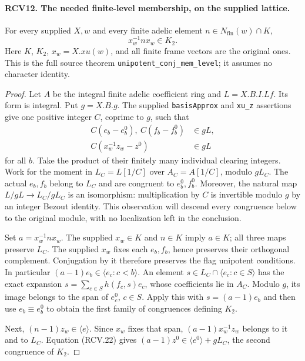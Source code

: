 
\paragraph{RCV12. The needed finite-level membership, on the supplied lattice.}
\label{claim:RCV12}
For every supplied \(X,w\) and every finite adelic element
\(n\in N_{\mathrm{fin}}(w)\cap K\),
\[
                         x_w^{-1}nx_w\in K_2.
\tag{RCV.21}
\]
Here \(K\), \(K_2\), \(x_w=X.xu(w)\), and all finite frame
vectors are the original ones.  This is the full source theorem
\texttt{unipotent\_conj\_mem\_level}; it assumes no character
identity.
\begin{proof}
Let \(A\) be the integral finite adelic coefficient ring and
\(L=X.B.I.Lf\).  Its form is integral.  Put \(g=X.B.g\).
The supplied \texttt{basisApprox} and \texttt{xu\_z} assertions
give one positive integer \(C\), coprime to \(g\), such that
\[
 \begin{split}
 C(e_b-e_b^0),\ C(f_b-f_b^0)&\in gL,\\
 C(x_w^{-1}z_w-z^0)&\in gL
 \end{split}
\tag{RCV.22}
\]
for all \(b\).  Take the product of their finitely many individual
clearing integers.  Work for the moment in \(L_C=L[1/C]\) over
\(A_C=A[1/C]\), modulo \(gL_C\).  The actual \(e_b,f_b\)
belong to \(L_C\) and are congruent to \(e_b^0,f_b^0\).
Moreover, the natural map \(L/gL\to L_C/gL_C\) is an
isomorphism: multiplication by \(C\) is invertible modulo \(g\)
by an integer Bezout identity.  This observation will descend every
congruence below to the original module, with no localization left
in the conclusion.

Set \(a=x_w^{-1}nx_w\).  The supplied \(x_w\in K\) and
\(n\in K\) imply \(a\in K\); all three maps preserve \(L_C\).
The supplied \(x_w\) fixes each \(e_b,f_b\), hence preserves
their orthogonal complement.  Conjugation by it therefore preserves
the flag unipotent conditions.  In particular
\((a-1)e_b\in\langle e_c:c<b\rangle\).
An element \(s\in L_C\cap\langle e_c:c\in S\rangle\)
has the exact expansion
\(s=\sum_{c\in S}h(f_c,s)e_c\), whose coefficients lie in
\(A_C\).  Modulo \(g\), its image belongs to the span of
\(e_c^0\), \(c\in S\).  Apply this with
\(s=(a-1)e_b\) and then use \(e_b\equiv e_b^0\) to obtain
the first family of congruences defining \(K_2\).

Next, \((n-1)z_w\in\langle e\rangle\).  Since \(x_w\)
fixes that span, \((a-1)x_w^{-1}z_w\) belongs to it and to
\(L_C\).  Equation (RCV.22) gives
\((a-1)z^0\in\langle e^0\rangle+gL_C\), the second
congruence of \(K_2\).


\end{proof}
